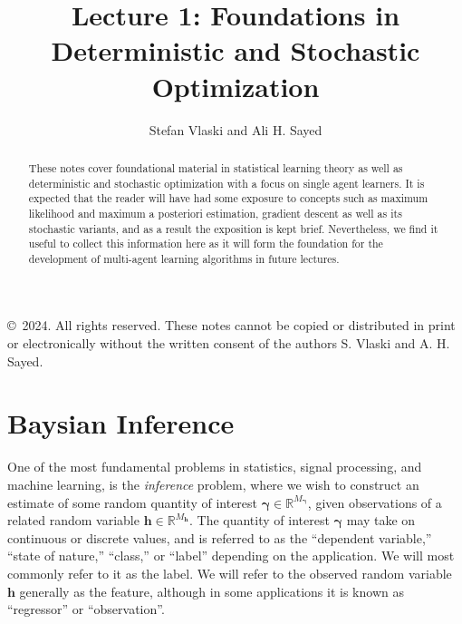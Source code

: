 \documentclass[oneside,11pt]{amsart}
\title{Lecture 1: Foundations in Deterministic and Stochastic Optimization}
\author{Stefan Vlaski and Ali H. Sayed}
\date{}
\theoremstyle{remark}
\begin{document}
\begin{abstract}
  These notes cover foundational material in statistical learning theory as well as deterministic and stochastic optimization with a focus on single agent learners. It is expected that the reader will have had some exposure to concepts such as maximum likelihood and maximum a posteriori estimation, gradient descent as well as its stochastic variants, and as a result the exposition is kept brief. Nevertheless, we find it useful to collect this information here as it will form the foundation for the development of multi-agent learning algorithms in future lectures.
\end{abstract}

\maketitle

\begin{lxFooter}
  \copyright\ 2024. All rights reserved. These notes cannot be copied or distributed in print or electronically without the written consent of the authors S. Vlaski and A. H. Sayed.
\end{lxFooter}

\section{Baysian Inference}
One of the most fundamental problems in statistics, signal processing, and machine learning, is the \emph{inference} problem, where we wish to construct an estimate of some random quantity of interest \( \boldsymbol{\gamma} \in \mathds{R}^{M_{\boldsymbol{\gamma}}}\), given observations of a related random variable \( \boldsymbol{h} \in \mathds{R}^{M_{\boldsymbol{h}}} \). The quantity of interest \( \boldsymbol{\gamma} \) may take on continuous or discrete values, and is referred to as the ``dependent variable,'' ``state of nature,'' ``class,'' or ``label'' depending on the application. We will most commonly refer to it as the label. We will refer to the observed random variable \( \boldsymbol{h} \) generally as the feature, although in some applications it is known as ``regressor'' or ``observation''.
\end{document}
